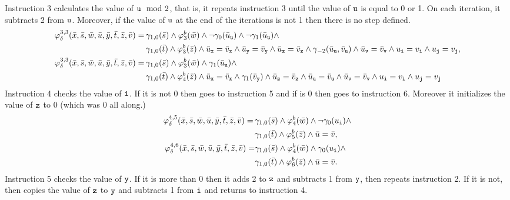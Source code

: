 Instruction 3 calculates the value of $\mathtt{u}\mod 2$, that is, it repeats instruction 3 until the value of $\mathtt{u}$ is equal to 0 or 1. On each iteration, it subtracts 2 from $\mathtt{u}$. Moreover, if the value of $\mathtt{u}$ at the end of the iterations is not 1 then there is no step defined.
\begin{align*}
\varphi^{3,3}_{\delta}(\bar{x},\bar{s},\bar{w},\bar{u},\bar{y},\bar{t},\bar{z},\bar{v}) = \,&\gamma_{1,0}(\bar{s}) \wedge \varphi^b_3(\bar{w}) \wedge \neg \gamma_0(\bar{u}_{\mathtt{u}}) \wedge \neg \gamma_1(\bar{u}_{\mathtt{u}}) \wedge \\ &\gamma_{1,0}(\bar{t}) \wedge 	\varphi^b_3(\bar{z}) \wedge
\bar{u}_{\mathtt{x}} = \bar{v}_{\mathtt{x}} \wedge
\bar{u}_{\mathtt{y}} = \bar{v}_{\mathtt{y}} \wedge
\bar{u}_{\mathtt{z}} = \bar{v}_{\mathtt{z}} \wedge
\gamma_{-2}(\bar{u}_{\mathtt{u}},\bar{v}_{\mathtt{u}}) \wedge
\bar{u}_{\mathtt{v}} = \bar{v}_{\mathtt{v}} \wedge
u_{\mathtt{i}} = v_{\mathtt{i}} \wedge u_{\mathtt{j}} = v_{\mathtt{j}},\\
\varphi^{3,3}_{\delta}(\bar{x},\bar{s},\bar{w},\bar{u},\bar{y},\bar{t},\bar{z},\bar{v}) = 
\,&\gamma_{1,0}(\bar{s}) \wedge \varphi^b_3(\bar{w}) \wedge \gamma_1(\bar{u}_{\mathtt{u}}) \wedge\\ &\gamma_{1,0}(\bar{t}) \wedge 	\varphi^b_4(\bar{z}) \wedge
\bar{u}_{\mathtt{x}} = \bar{v}_{\mathtt{x}} \wedge
\gamma_1(\bar{v}_{\mathtt{y}}) \wedge
\bar{u}_{\mathtt{z}} = \bar{v}_{\mathtt{z}} \wedge
\bar{u}_{\mathtt{u}} = \bar{v}_{\mathtt{u}} \wedge
\bar{u}_{\mathtt{v}} = \bar{v}_{\mathtt{v}} \wedge
u_{\mathtt{i}} = v_{\mathtt{i}} \wedge u_{\mathtt{j}} = v_{\mathtt{j}}
\end{align*}
Instruction 4 checks the value of $\mathtt{i}$. If it is not 0 then goes to instruction 5 and if is 0 then goes to instruction 6. Moreover it initializes the value of $\mathtt{z}$ to 0 (which was 0 all along.)
\begin{align*}
\varphi^{4,5}_{\delta}(\bar{x},\bar{s},\bar{w},\bar{u},\bar{y},\bar{t},\bar{z},\bar{v}) = \,&\gamma_{1,0}(\bar{s}) \wedge \varphi^b_4(\bar{w}) \wedge \neg \gamma_0(u_{\mathtt{i}}) \wedge \\ &\gamma_{1,0}(\bar{t}) \wedge 	\varphi^b_5(\bar{z}) \wedge \bar{u} = \bar{v}, \\
\varphi^{4,6}_{\delta}(\bar{x},\bar{s},\bar{w},\bar{u},\bar{y},\bar{t},\bar{z},\bar{v}) = &\gamma_{1,0}(\bar{s}) \wedge \varphi^b_4(\bar{w}) \wedge \gamma_0(u_{\mathtt{i}}) \wedge \\ &\gamma_{1,0}(\bar{t}) \wedge 	\varphi^b_6(\bar{z}) \wedge \bar{u} = \bar{v}.
\end{align*}
Instruction 5 checks the value of $\mathtt{y}$. If it is more than 0 then it adds 2 to $\mathtt{z}$ and subtracts 1 from $\mathtt{y}$, then repeats instruction 2. If it is not, then copies the value of $\mathtt{z}$ to $\mathtt{y}$ and subtracts 1 from $\mathtt{i}$ and returns to instruction 4.
